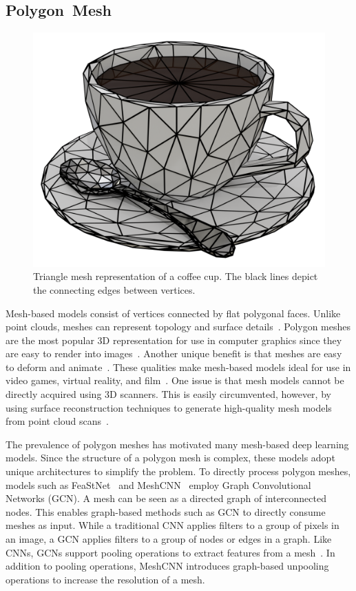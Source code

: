 \subsection{Polygon~Mesh}
\label{subsec:polygon_mesh}

\begin{figure}[h]
	\centering
	\includegraphics[scale=0.2]{Images/Mesh Cup}
	\caption{Triangle mesh representation of a coffee cup. The black lines depict the connecting edges between vertices.}
	\label{fig:mesh_cup}
\end{figure}

Mesh-based models consist of vertices connected by flat polygonal faces. Unlike point clouds, meshes can represent topology and surface details~\cite{Xiao2020}. Polygon meshes are the most popular 3D representation for use in computer graphics since they are easy to render into images~\cite{Watt1996}. Another unique benefit is that meshes are easy to deform and animate~\cite{Wang2018}. These qualities make mesh-based models ideal for use in video games, virtual reality, and film~\cite{Nash2020}. One issue is that mesh models cannot be directly acquired using 3D scanners. This is easily circumvented, however, by using surface reconstruction techniques to generate high-quality mesh models from point cloud scans~\cite{Yuan2022}.

The prevalence of polygon meshes has motivated many mesh-based deep learning models. Since the structure of a polygon mesh is complex, these models adopt unique architectures to simplify the problem. To directly process polygon meshes, models such as FeaStNet~\cite{Verma2018} and MeshCNN~\cite{Hanocka2019} employ Graph Convolutional Networks (GCN). A mesh can be seen as a directed graph of interconnected nodes. This enables graph-based methods such as GCN to directly consume meshes as input. While a traditional CNN applies filters to a group of pixels in an image, a GCN applies filters to a group of nodes or edges in a graph. Like CNNs, GCNs support pooling operations to extract features from a mesh~\cite{Verma2018}. In addition to pooling operations, MeshCNN introduces graph-based unpooling operations to increase the resolution of a mesh.

